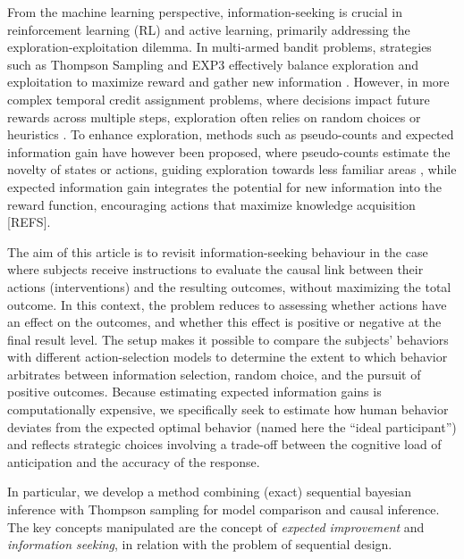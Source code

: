 \documentclass[10pt,letterpaper]{article}
\begin{document}
From the machine learning perspective, information-seeking is crucial in reinforcement learning (RL) and active learning, primarily addressing the exploration-exploitation dilemma. In multi-armed bandit problems, strategies such as Thompson Sampling and EXP3 effectively balance exploration and exploitation to maximize reward and gather new information \cite{robbins1952some, sutton1988learning, thompson1933likelihood, chapelle2011empirical, auer2002finite}. However, in more complex temporal credit assignment problems, where decisions impact future rewards across multiple steps, exploration often relies on random choices or heuristics \cite{sutton1998introduction}. To enhance exploration, methods such as pseudo-counts and expected information gain have however been proposed, where pseudo-counts estimate the novelty of states or actions, guiding exploration towards less familiar areas \cite{bellemare2016unifying}, while expected information gain integrates the potential for new information into the reward function, encouraging actions that maximize knowledge acquisition [REFS].

The aim of this article is to revisit information-seeking behaviour in the case where subjects receive instructions to evaluate the causal link between their actions (interventions) and the resulting outcomes, without maximizing the total outcome. In this context, the problem reduces to assessing whether actions have an effect on the outcomes, and whether this effect is positive or negative at the final result level. The setup makes it possible to compare the subjects' behaviors with different action-selection models to determine the extent to which behavior arbitrates between information selection, random choice, and the pursuit of positive outcomes. Because estimating expected information gains is computationally expensive, we specifically seek to estimate how human behavior deviates from the expected optimal behavior (named here the ``ideal participant'') and reflects strategic choices involving a trade-off between the cognitive load of anticipation and the accuracy of the response.

In particular, we develop a method combining (exact) sequential bayesian inference with Thompson sampling for model comparison and causal inference. The key concepts manipulated are the concept of \emph{expected improvement} and   
\emph{information seeking}, in relation with the problem of sequential design.

\end{document}
